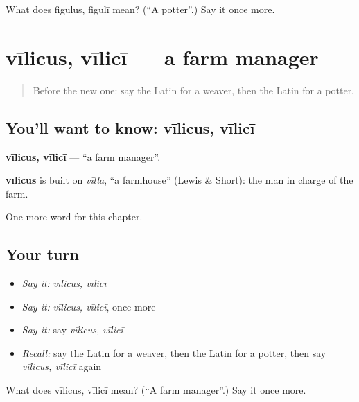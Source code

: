 \begin{tcolorbox}[breakable,colback=teal!4,colframe=teal!35!black,title={Before you move on}]
What does figulus, figulī mean? (\textquotedblleft{}A potter\textquotedblright{}.) Say it once more.
\end{tcolorbox}
\section[vīlicus, vīlicī]{vīlicus, vīlicī — a farm manager}

\label{lesson:LA-C188-vilicus}



\begin{quote}
Before the new one: say the Latin for a weaver, then the Latin for a potter.
\end{quote}

\subsection*{You'll want to know: vīlicus, vīlicī}
\textbf{vīlicus, vīlicī} — \textquotedblleft{}a farm manager\textquotedblright{}.

\begin{cousinweb}
\textbf{vīlicus} is built on \emph{vīlla}, \textquotedblleft{}a farmhouse\textquotedblright{} (Lewis \& Short): the man in charge of the farm.
\end{cousinweb}

\begin{grammarlens}[title={What you've built}]
One more word for this chapter.
\end{grammarlens}

\subsection*{Your turn}
\begin{itemize}
\raggedright
  \item \emph{Say it:} \emph{vīlicus, vīlicī}
  \item \emph{Say it:} \emph{vīlicus, vīlicī}, once more
  \item \emph{Say it:} say \emph{vīlicus, vīlicī}
  \item \emph{Recall:} say the Latin for a weaver, then the Latin for a potter, then say \emph{vīlicus, vīlicī} again
\end{itemize}

\begin{tcolorbox}[breakable,colback=teal!4,colframe=teal!35!black,title={Before you move on}]
What does vīlicus, vīlicī mean? (\textquotedblleft{}A farm manager\textquotedblright{}.) Say it once more.
\end{tcolorbox}
